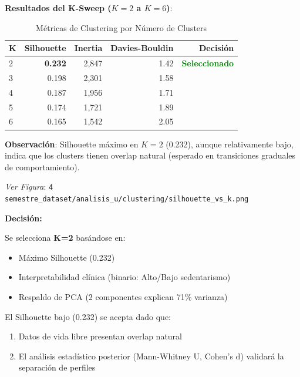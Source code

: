 \documentclass[12pt,letterpaper,twoside]{report}
\begin{document}
\begin{calculobox}
\textbf{Resultados del K-Sweep ($K=2$ a $K=6$)}:

\begin{table}[H]
\centering
\caption{Métricas de Clustering por Número de Clusters}
\label{tab:k_sweep}
\begin{tabular}{@{}lrrrr@{}}
\toprule
\textbf{K} & \textbf{Silhouette} & \textbf{Inertia} & \textbf{Davies-Bouldin} & \textbf{Decisión} \\
\midrule
2 & \textbf{0.232} & 2,847 & 1.42 & \textcolor{green}{\textbf{Seleccionado}} \\
3 & 0.198       & 2,301 & 1.58 & \\
4 & 0.187       & 1,956 & 1.71 & \\
5 & 0.174       & 1,721 & 1.89 & \\
6 & 0.165       & 1,542 & 2.05 & \\
\bottomrule
\end{tabular}
\end{table}

\textbf{Observación}: Silhouette máximo en $K=2$ (0.232), aunque relativamente bajo, indica que los clusters tienen overlap natural (esperado en transiciones graduales de comportamiento).
\end{calculobox}

\textit{Ver Figura}: \texttt{4 semestre\_dataset/analisis\_u/clustering/silhouette\_vs\_k.png}

\begin{decisionbox}
\textbf{Decisión:}

Se selecciona \textbf{K=2} basándose en:
\begin{itemize}[noitemsep]
    \item Máximo Silhouette (0.232)
    \item Interpretabilidad clínica (binario: Alto/Bajo sedentarismo)
    \item Respaldo de PCA (2 componentes explican 71\% varianza)
\end{itemize}

El Silhouette bajo (0.232) se acepta dado que:
\begin{enumerate}[noitemsep]
    \item Datos de vida libre presentan overlap natural
    \item El análisis estadístico posterior (Mann-Whitney U, Cohen's d) validará la separación de perfiles
\end{enumerate}
\end{decisionbox}
\end{document}
